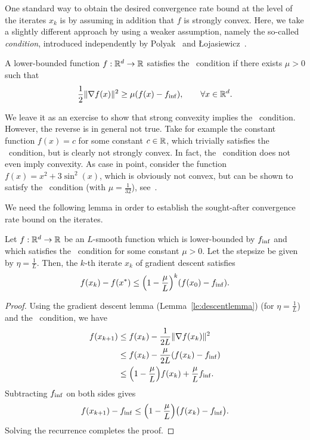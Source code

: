 One standard way to obtain the desired convergence rate bound at the level of the iterates $x_k$ is by assuming  in addition that $f$ is strongly convex. Here, we take a slightly different approach by using a weaker assumption, namely the so-called {\em \PL condition}, introduced independently by Polyak~\cite{Pol63} and \L ojasiewicz~\cite{Loj63}.

\begin{definition}[\PLC]\label{PL condition}
A lower-bounded function $f: \mathbb{R}^d \to \mathbb{R}$ satisfies the \PL\ condition if there exists $\mu > 0$ such that
$$
\frac{1}{2} \|\nabla f(x) \|^2 \ge \mu (f(x) - {f_{\inf}}), \qquad \forall x \in \mathbb{R}^d.
$$
\end{definition}

We leave it as an exercise to show that strong convexity implies the \PL\ condition. However, the reverse is in general not true. Take for example the constant function $f(x)=c$ for some constant $c \in \mathbb{R}$, which trivially satisfies the \PL\ condition, but is clearly not strongly convex. In fact, the \PL\ condition does not even imply convexity. As case in point, consider the function $f(x) = x^2 + 3\sin^2(x)$, which is obviously not convex, but can be shown to satisfy the \PL\ condition (with $\mu = \frac{1}{32}$), see~\cite{karimi2016linear}.


We need the following lemma in order to establish the sought-after convergence rate bound on the iterates.


\begin{lemma}
   \label{le:PL} 
Let $f: \mathbb{R}^d \to \mathbb{R}$ be an $L$-smooth function which is lower-bounded by ${f_{\inf}}$ and which satisfies the \PL\ condition for some constant $\mu > 0$. Let the stepsize be given by $\eta = \frac{1}{L}$. Then, the $k$-th iterate $x_k$ of gradient descent satisfies
\begin{equation}
f(x_k) - f(x^*) \le \Big(1 - \frac{\mu}{L} \Big)^k (f(x_0) - {f_{\inf}}).
\end{equation}
\end{lemma}

\begin{proof}
Using the gradient descent lemma (Lemma~\ref{le:descentlemma}) (for $\eta = \frac{1}{L}$) and the \PL\  condition, we have
\begin{align*}
f(x_{k+1}) & \le f(x_k) - \frac{1}{2L} \| \nabla f(x_k)\|^2 \\
& \le f(x_k) - \frac{\mu}{2L} (f(x_k) - {f_{\inf}}) \\
& \le \Big(1-\frac{\mu}{L}\Big) f(x_k) + \frac{\mu}{L} {f_{\inf}}.
\end{align*}
Subtracting ${f_{\inf}}$ on both sides gives
$$
f(x_{k+1}) -  {f_{\inf}} \le \Big(1-\frac{\mu}{L}\Big) \big( f(x_k) - {f_{\inf}} \big).
$$
Solving the recurrence completes the proof.
    
\end{proof}

